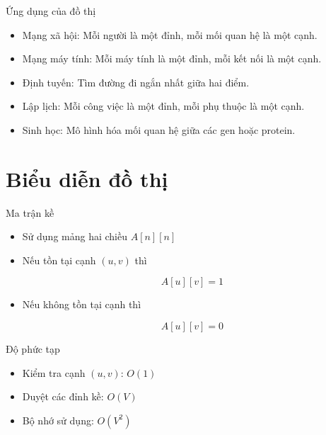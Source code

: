 \documentclass[aspectratio=169]{beamer}
\begin{document}
\begin{frame}{Ứng dụng của đồ thị}
\begin{itemize}
  \item Mạng xã hội: Mỗi người là một đỉnh, mỗi mối quan hệ là một cạnh.
  \item Mạng máy tính: Mỗi máy tính là một đỉnh, mỗi kết nối là một cạnh.
  \item Định tuyến: Tìm đường đi ngắn nhất giữa hai điểm.
  \item Lập lịch: Mỗi công việc là một đỉnh, mỗi phụ thuộc là một cạnh.
  \item Sinh học: Mô hình hóa mối quan hệ giữa các gen hoặc protein.
\end{itemize}
\end{frame}

\section{Biểu diễn đồ thị}

\begin{frame}{Ma trận kề}

\begin{itemize}

\item Sử dụng mảng hai chiều $A[n][n]$

\item Nếu tồn tại cạnh $(u,v)$ thì

\[
A[u][v] = 1
\]

\item Nếu không tồn tại cạnh thì

\[
A[u][v] = 0
\]

\end{itemize}

\begin{block}{Độ phức tạp}

\begin{itemize}

\item Kiểm tra cạnh $(u,v)$: $O(1)$

\item Duyệt các đỉnh kề: $O(V)$

\item Bộ nhớ sử dụng: $O(V^2)$

\end{itemize}

\end{block}

\end{frame}
\end{document}
